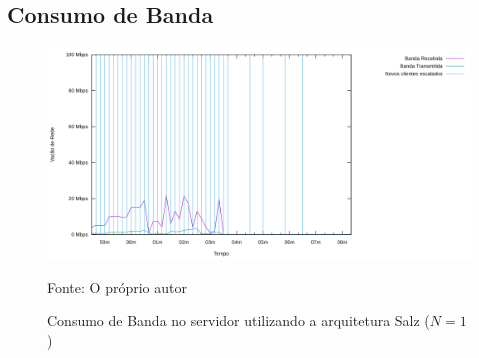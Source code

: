 \subsection{Consumo de Banda}

\begin{figure}[htb!]
  \caption{Consumo de Banda no servidor utilizando a arquitetura Salz ($N=1$)}
  \label{fig:rudy_t4_io}
  \includegraphics[width=\textwidth]{metricas_salz_t2/io.png}
  \centering
  
  Fonte: O próprio autor
\end{figure}

